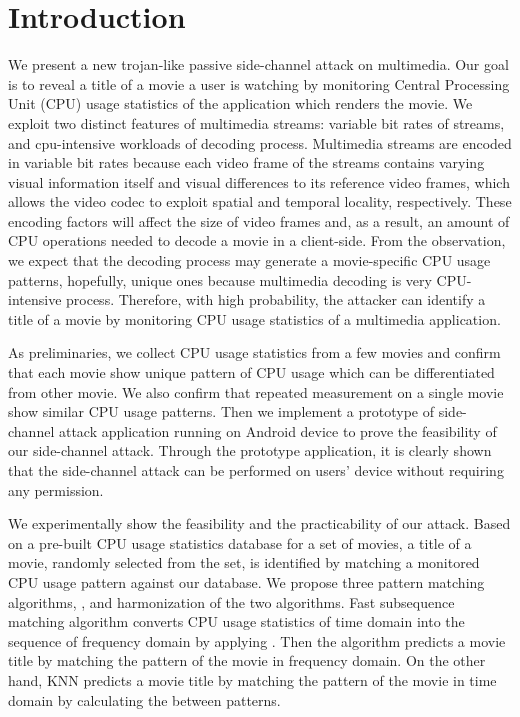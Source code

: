 \section{Introduction}
\label{sec:introduction}
We present a new trojan-like passive side-channel attack on multimedia. Our goal is to reveal a title of a movie a user is watching by monitoring Central Processing Unit (CPU) usage statistics of the application which renders the movie. We exploit two distinct features of multimedia streams: variable bit rates of streams, and cpu-intensive workloads of decoding process. Multimedia streams are encoded in variable bit rates because each video frame of the streams contains varying visual information itself and visual differences to its reference video frames, which allows the video codec to exploit spatial and temporal locality, respectively. These encoding factors will affect the size of video frames and, as a result, an amount of CPU operations needed to decode a movie in a client-side. From the observation, we expect that the decoding process may generate a movie-specific CPU usage patterns, hopefully, unique ones because multimedia decoding is very CPU-intensive process. Therefore, with high probability, the attacker can identify a title of a movie by monitoring CPU usage statistics of a multimedia application.  

As preliminaries, we collect CPU usage statistics from a few movies and confirm that each movie show unique pattern of CPU usage which can be differentiated from other movie.  We also confirm that repeated measurement on a single movie show similar CPU usage patterns.  Then we implement a prototype of side-channel attack application running on Android device to prove the feasibility of our side-channel attack.  Through the prototype application, it is clearly shown that the side-channel attack can be performed on users' device without requiring any permission.

We experimentally show the feasibility and the practicability of our attack. Based on a pre-built CPU usage statistics database for a set of movies, a title of a movie, randomly selected from the set, is identified by matching a monitored CPU usage pattern against our database. We propose three pattern matching algorithms, ,  and harmonization of the two algorithms.  Fast subsequence matching algorithm converts CPU usage statistics of time domain into the sequence of frequency domain by applying .   Then the algorithm predicts a movie title by matching the pattern of the movie in frequency domain.  On the other hand, KNN predicts a movie title by matching the pattern of the movie in time domain by calculating the  between patterns. 

